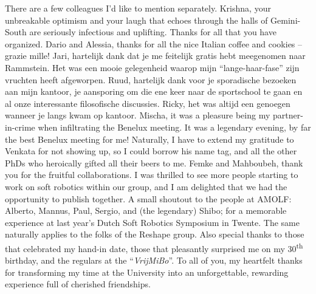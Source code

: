 There are a few colleagues I'd like to mention separately. Krishna, your unbreakable optimism and your laugh that echoes through the halls of Gemini-South are seriously infectious and uplifting. Thanks for all that you have organized. Dario and Alessia, thanks for all the nice Italian coffee and cookies -- grazie mille! Jari, hartelijk dank dat je me feitelijk gratis hebt meegenomen naar Rammstein. Het was een mooie gelegenheid waarop mijn ``lange-haar-fase'' zijn vruchten heeft afgeworpen. Ruud, hartelijk dank voor je sporadische bezoeken aan mijn kantoor, je aansporing om die ene keer naar de sportschool te gaan en al onze interessante filosofische discussies. Ricky, het was altijd een genoegen wanneer je langs kwam op kantoor. Mischa, it was a pleasure being my partner-in-crime when infiltrating the Benelux meeting. It was a legendary evening, by far the best Benelux meeting for me! Naturally, I have to extend my gratitude to Venkata for not showing up, so I could borrow his name tag, and all the other PhDs who heroically gifted all their beers to me. Femke and Mahboubeh, thank you for the fruitful collaborations. I was thrilled to see more people starting to work on soft robotics within our group, and I am delighted that we had the opportunity to publish together. A small shoutout to the people at AMOLF: Alberto, Mannus, Paul, Sergio, and (the legendary) Shibo; for a memorable experience at last year's Dutch Soft Robotics Symposium in Twente.
The same naturally applies to the folks of the Reshape group. Also special thanks to those that celebrated my hand-in date, those that pleasantly surprised me on my 30\textsuperscript{th} birthday, and the regulars at the ``\textit{VrijMiBo}''. To all of you, my heartfelt thanks for transforming my time at the University into an unforgettable, rewarding experience full of cherished friendships.

